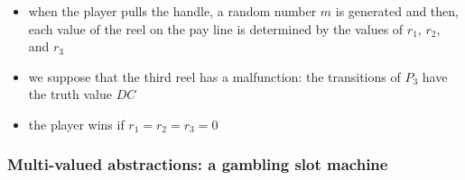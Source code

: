 \begin{frame}
\begin{itemize}
\item when the player pulls the handle, a random number $m$ 
is generated and then, each value of the reel on the pay line 
is determined by the values of $r_1$, $r_2$, and $r_3$
\item we suppose that the third reel has a malfunction:
the transitions of $P_3$ have the truth value $DC$
\item the player wins if $r_1=r_2=r_3=0$
\end{itemize}
\end{frame}

\begin{frame}
\frametitle{Multi-valued abstractions: a gambling slot machine}
\begin{figure}[hbt]
\begin{center}
\end{center}
\end{figure}
\end{frame}
